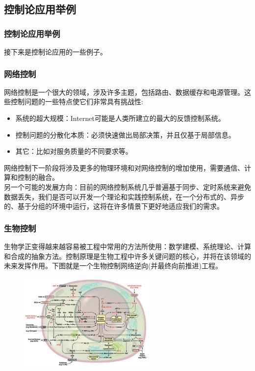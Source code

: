 \documentclass[12pt,AutoFakeBold,aspectratio=43,mathserif]{beamer}
\begin{document}
    \subsection{控制论应用举例}
    \begin{frame}
        \frametitle{控制论应用举例}
        接下来是控制论应用的一些例子。
    \end{frame}
    \begin{frame}
        \frametitle{网络控制}
        \footnotesize 网络控制是一个很大的领域，涉及许多主题，包括路由、数据缓存和电源管理。这些控制问题的一些特点使它们非常具有挑战性: \pause
        \begin{itemize}
            \item  系统的超大规模：Internet可能是人类所建立的最大的反馈控制系统。
            \item  控制问题的分散化本质：必须快速做出局部决策，并且仅基于局部信息。
            \item  其它：比如对服务质量的不同要求等。
        \end{itemize} \pause
        网络控制下一阶段将涉及更多的物理环境和对网络控制的增加使用，需要通信、计算和控制的融合。 \\ \pause
        另一个可能的发展方向：目前的网络控制系统几乎普遍基于同步、定时系统来避免数据丢失，我们是否可以开发一个理论和实践控制系统，在一个分布式的、异步的、基于分组的环境中运行，这将在许多情景下更好地适应我们的需求。
    \end{frame}
    \begin{frame}
        \frametitle{生物控制}
        \footnotesize 生物学正变得越来越容易被工程中常用的方法所使用：数学建模、系统理论、计算和合成的抽象方法。控制原理是生物工程中许多关键问题的核心，并将在该领域的未来发挥作用。下图就是一个生物控制网络逆向(并最终向前推进)工程。 \pause
        \begin{figure}[htbp]
            \setlength{\abovecaptionskip}{0.cm}
            \setlength{\belowcaptionskip}{-0.cm}
            \centering
            \vspace{-0.3cm}
            \setlength{\abovecaptionskip}{0.cm}
            \setlength{\belowcaptionskip}{-0.cm}
            \includegraphics[width=0.6\textwidth]{figures/3-4.png}
        \end{figure}
    \end{frame}
\end{document}
